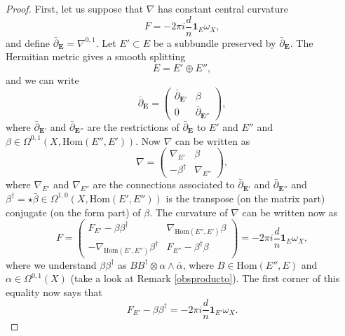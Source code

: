 \documentclass[12pt,a4paper]{book}
\theoremstyle{definition} \newtheorem{defn}[thm]{Definition}
\theoremstyle{definition} \newtheorem{ejemplo}[thm]{Example}
\theoremstyle{remark} \newtheorem{rem}[thm]{Remark}
\def\id{\mathbf{1}}
\def\Hom{\mathrm{Hom}}
\def\delbar{\bar{\partial}}
\newcommand{\ve}[1]{\mathbf{#1}}
\begin{document}
\begin{proof}
First, let us suppose that $\nabla$ has constant central curvature
\begin{equation*}
  F=-2\pi i \frac{d}{n} \id_E \omega_X,
\end{equation*}
and define $\delbar_{\ve{E}}=\nabla^{0,1}$. Let $E'\subset E$ be a subbundle preserved by $\delbar_{\ve{E}}$. The Hermitian metric gives a smooth splitting
\begin{equation*}
  E=E'\oplus E'',
\end{equation*}
and we can write
\begin{equation*}
  \delbar_{\ve{E}}=\left(
  \begin{array}{cc}
    \delbar_{\ve{E}'} & \beta \\
    0 & \delbar_{\ve{E}''}
  \end{array}\right),
\end{equation*}
where $\delbar_{\ve{E}'}$ and $\delbar_{\ve{E}''}$ are the restrictions of $\delbar_{\ve{E}}$ to $E'$ and $E''$ and $\beta \in \Omega^{0,1}(X,\Hom (E'',E'))$. Now $\nabla$ can be written as
\begin{equation*}
  \nabla=\left(
  \begin{array}{cc}
    \nabla_{E'} & \beta \\
    -\beta^\dagger & \nabla_{E''}
  \end{array}\right),
\end{equation*}
where $\nabla_{E'}$ and $\nabla_{E''}$ are the connections associated to $\delbar_{\ve{E}'}$ and $\delbar_{\ve{E}''}$ and $\beta^\dagger=\star \bar{\beta} \in \Omega^{1,0}(X,\Hom(E',E''))$ is the transpose (on the matrix part) conjugate (on the form part) of $\beta$. The curvature of $\nabla$ can be written now as
\begin{equation*}
  F=\left(
  \begin{array}{cc}
    F_{E'}-\beta \beta^\dagger & \nabla_{\Hom(E'',E')}\beta \\
    -\nabla_{\Hom (E',E'')}\beta^\dagger & F_{E''}-\beta^\dagger  \beta
  \end{array}\right)=-2\pi i\frac{d}{n} \id_E \omega_X,
\end{equation*}
where we understand $\beta \beta^\dagger$ as $BB^\dagger \otimes \alpha \wedge \bar{\alpha}$, where $B \in \Hom(E'',E)$ and $\alpha \in \Omega^{0,1}(X)$ (take a look at Remark \ref{obsproducto}).
The first corner of this equality now says that
\begin{equation*}
  F_{E'}-\beta\beta^\dagger = -2\pi i \frac{d}{n} \id_{E'} \omega_X.

\end{equation*}
\end{proof}
\end{document}
